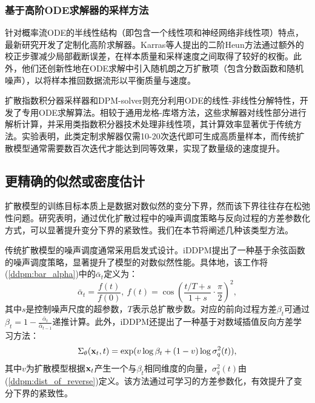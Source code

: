 \documentclass[11pt,a4paper,UTF8]{ctexart}
\begin{document}
\subsubsection{基于高阶ODE求解器的采样方法}

针对概率流ODE的半线性结构（即包含一个线性项和神经网络非线性项）特点，最新研究开发了定制化高阶求解器。Karras等人\cite{karras2022elucidating}提出的二阶Heun方法\cite{ascher1998computer}通过额外的校正步骤减少局部截断误差，在样本质量和采样速度之间取得了较好的权衡。此外，他们还创新性地在ODE求解中引入随机朗之万扩散项（包含分数函数和随机噪声），以将样本推回数据流形以平衡质量与速度。

扩散指数积分器采样器\cite{zhang2022fast}和DPM-solver\cite{lu2022dpm}则充分利用ODE的线性-非线性分解特性，开发了专用ODE求解算法。相较于通用龙格-库塔方法，这些求解器对线性部分进行解析计算，并采用类指数积分器技术处理非线性项，其计算效率显著优于传统方法。实验表明，此类定制求解器仅需10-20次迭代即可生成高质量样本，而传统扩散模型通常需要数百次迭代才能达到同等效果，实现了数量级的速度提升。


\subsection{更精确的似然或密度估计}

扩散模型的训练目标本质上是数据对数似然的变分下界，然而该下界往往存在松弛性问题。研究表明，通过优化扩散过程中的噪声调度策略与反向过程的方差参数化方式，可以显著提升变分下界的紧致性。我们在本节将阐述几种该类型方法。

传统扩散模型的噪声调度通常采用启发式设计。iDDPM\cite{nichol2021improved}提出了一种基于余弦函数的噪声调度策略，显著提升了模型的对数似然性能。具体地，该工作将(\ref{ddpm:bar_alpha})中的$\bar{\alpha}_t$定义为：
\begin{equation*}
    \bar{\alpha}_t=\frac{f(t)}{f(0)},\ f(t)=\cos\left(\frac{t/T+s}{1+s}\cdot\frac{\pi}{2}\right)^2,
\end{equation*}
其中$s$是控制噪声尺度的超参数，$T$表示总扩散步数。对应的前向过程方差$\beta_t$可通过$\beta_t=1-\frac{\bar{\alpha}_t}{\bar{\alpha}_{t-1}}$递推计算。此外，iDDPM还提出了一种基于对数域插值反向方差学习方法：
\begin{equation*}
    \Sigma_\theta(\mathbf{x}_t,t)=\exp (v\log\beta_t + (1-v)\log \sigma_q^2(t)),
\end{equation*}
其中$v$为扩散模型根据$\mathbf{x}_t$产生一个与$\beta_t$相同维度的向量，$\sigma_q^2(t)$由(\ref{ddpm:dist_of_reverse})定义。该方法通过可学习的方差参数化，有效提升了变分下界的紧致性。
\end{document}
